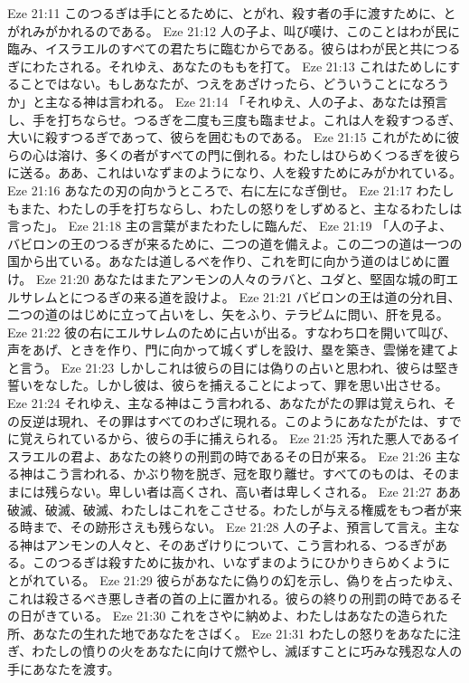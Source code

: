 Eze 21:11  このつるぎは手にとるために、とがれ、殺す者の手に渡すために、とがれみがかれるのである。
Eze 21:12  人の子よ、叫び嘆け、このことはわが民に臨み、イスラエルのすべての君たちに臨むからである。彼らはわが民と共につるぎにわたされる。それゆえ、あなたのももを打て。
Eze 21:13  これはためしにすることではない。もしあなたが、つえをあざけったら、どういうことになろうか」と主なる神は言われる。
Eze 21:14  「それゆえ、人の子よ、あなたは預言し、手を打ちならせ。つるぎを二度も三度も臨ませよ。これは人を殺すつるぎ、大いに殺すつるぎであって、彼らを囲むものである。
Eze 21:15  これがために彼らの心は溶け、多くの者がすべての門に倒れる。わたしはひらめくつるぎを彼らに送る。ああ、これはいなずまのようになり、人を殺すためにみがかれている。
Eze 21:16  あなたの刃の向かうところで、右に左になぎ倒せ。
Eze 21:17  わたしもまた、わたしの手を打ちならし、わたしの怒りをしずめると、主なるわたしは言った」。
Eze 21:18  主の言葉がまたわたしに臨んだ、
Eze 21:19  「人の子よ、バビロンの王のつるぎが来るために、二つの道を備えよ。この二つの道は一つの国から出ている。あなたは道しるべを作り、これを町に向かう道のはじめに置け。
Eze 21:20  あなたはまたアンモンの人々のラバと、ユダと、堅固な城の町エルサレムとにつるぎの来る道を設けよ。
Eze 21:21  バビロンの王は道の分れ目、二つの道のはじめに立って占いをし、矢をふり、テラピムに問い、肝を見る。
Eze 21:22  彼の右にエルサレムのために占いが出る。すなわち口を開いて叫び、声をあげ、ときを作り、門に向かって城くずしを設け、塁を築き、雲悌を建てよと言う。
Eze 21:23  しかしこれは彼らの目には偽りの占いと思われ、彼らは堅き誓いをなした。しかし彼は、彼らを捕えることによって、罪を思い出させる。
Eze 21:24  それゆえ、主なる神はこう言われる、あなたがたの罪は覚えられ、その反逆は現れ、その罪はすべてのわざに現れる。このようにあなたがたは、すでに覚えられているから、彼らの手に捕えられる。
Eze 21:25  汚れた悪人であるイスラエルの君よ、あなたの終りの刑罰の時であるその日が来る。
Eze 21:26  主なる神はこう言われる、かぶり物を脱ぎ、冠を取り離せ。すべてのものは、そのままには残らない。卑しい者は高くされ、高い者は卑しくされる。
Eze 21:27  ああ破滅、破滅、破滅、わたしはこれをこさせる。わたしが与える権威をもつ者が来る時まで、その跡形さえも残らない。
Eze 21:28  人の子よ、預言して言え。主なる神はアンモンの人々と、そのあざけりについて、こう言われる、つるぎがある。このつるぎは殺すために抜かれ、いなずまのようにひかりきらめくようにとがれている。
Eze 21:29  彼らがあなたに偽りの幻を示し、偽りを占ったゆえ、これは殺さるべき悪しき者の首の上に置かれる。彼らの終りの刑罰の時であるその日がきている。
Eze 21:30  これをさやに納めよ、わたしはあなたの造られた所、あなたの生れた地であなたをさばく。
Eze 21:31  わたしの怒りをあなたに注ぎ、わたしの憤りの火をあなたに向けて燃やし、滅ぼすことに巧みな残忍な人の手にあなたを渡す。
